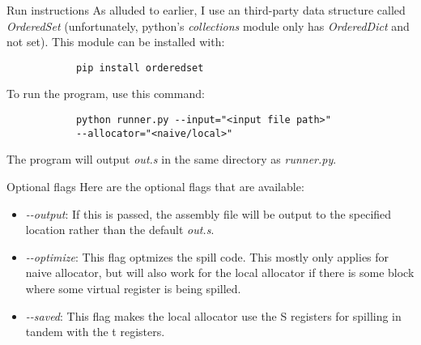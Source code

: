 \documentclass[letterpaper,12pt]{article}
\theoremstyle{definition}
\begin{document}
    \begin{section}{Run instructions}
        As alluded to earlier, I use an third-party data structure called \textit{OrderedSet} (unfortunately, python's \textit{collections} module only has \textit{OrderedDict} and not set). This module can be installed with:
        \begin{verbatim}
            pip install orderedset
        \end{verbatim}
        To run the program, use this command:
        \begin{verbatim}
            python runner.py --input="<input file path>"
            --allocator="<naive/local>"
        \end{verbatim}

        The program will output \textit{out.s} in the same directory as \textit{runner.py}.

        \begin{subsection}{Optional flags}
            Here are the optional flags that are available:
            \begin{itemize}
                \item \textit{-{}-output}: If this is passed, the assembly file will be output to the specified location rather than the default \textit{out.s}.
                \item \textit{-{}-optimize}: This flag optmizes the spill code. This mostly only applies for naive allocator, but will also work for the local allocator if there is some block where some virtual register is being spilled.
                \item \textit{-{}-saved}: This flag makes the local allocator use the S registers for spilling in tandem with the t registers.
            \end{itemize}
        \end{subsection}
    \end{section}
\end{document}
